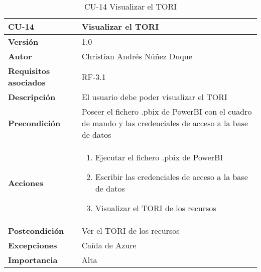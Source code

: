 \begin{table}[p]
	\centering
	\begin{tabularx}{\linewidth}{ p{} p{} }
		\toprule
		\textbf{CU-14}    & \textbf{Visualizar el TORI}\\
		\toprule
		\textbf{Versión}              & 1.0    \\
		\textbf{Autor}                & Christian Andrés Núñez Duque \\
		\textbf{Requisitos asociados} & RF-3.1 \\
		\textbf{Descripción}          & El usuario debe poder visualizar el TORI \\
		\textbf{Precondición}         & Poseer el fichero .pbix de PowerBI con el cuadro de mando y las credenciales de acceso a la base de datos \\
		\textbf{Acciones}             &
		\begin{enumerate}
			\def\labelenumi{\arabic{enumi}.}
			\tightlist
			\item Ejecutar el fichero .pbix de PowerBI
			\item Escribir las credenciales de acceso a la base de datos
			\item Visualizar el TORI de los recursos
		\end{enumerate}\\
		\textbf{Postcondición}        & Ver el TORI de los recursos \\
		\textbf{Excepciones}          & Caída de Azure \\
		\textbf{Importancia}          & Alta \\
		\bottomrule
	\end{tabularx}
	\caption{CU-14 Visualizar el TORI}
\end{table}

